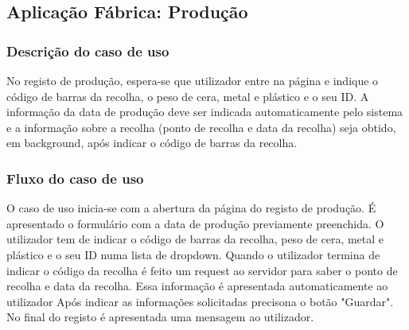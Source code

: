 \subsection{Aplicação Fábrica: Produção}
\subsubsection*{Descrição do caso de uso}
No registo de produção, espera-se que utilizador entre na página e indique o código de barras da recolha, o peso de cera, metal e plástico e o seu ID. A informação da data de produção deve ser indicada automaticamente pelo sistema e a informação sobre a recolha (ponto de recolha e data da recolha) seja obtido, em background, após indicar o código de barras da recolha.


\subsubsection*{Fluxo do caso de uso}
O caso de uso inicia-se com a abertura da página do registo de produção. É apresentado o formulário com a data de produção previamente preenchida. O utilizador tem de indicar o código de barras da recolha, peso de cera, metal e plástico e o seu ID numa lista de dropdown. Quando o utilizador termina de indicar o código da recolha é feito um request ao servidor para saber o ponto de recolha e data da recolha. Essa informação é apresentada automaticamente ao utilizador Após indicar as informações solicitadas precisona o botão "Guardar". No final do registo é apresentada uma mensagem ao utilizador.

